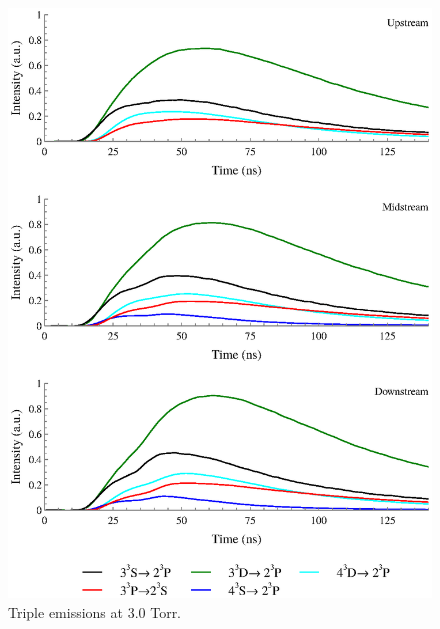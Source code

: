 \begin{figure}
  \centering
  \includegraphics{./chapters/extraem/figures/3torr_t.eps}
  \caption{Triple emissions at 3.0 Torr.}
\end{figure}

